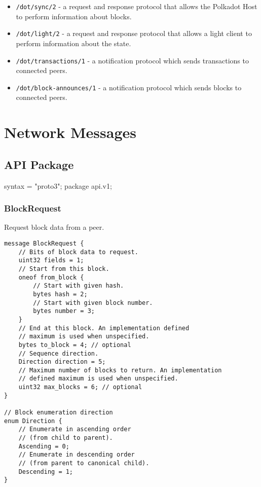 \documentclass{book}
\begin{document}
\begin{itemize}
    \item \verb|/dot/sync/2| - a request and response protocol that
    allows the Polkadot Host to perform information about blocks.
    \item \verb|/dot/light/2| - a request and response protocol that
    allows a light client to perform information about the state.
    \item \verb|/dot/transactions/1| - a notification protocol which
    sends transactions to connected peers.
    \item \verb|/dot/block-announces/1| - a notification protocol
    which sends blocks to connected peers.
\end{itemize}

\section{Network Messages}

\subsection{API Package}

syntax = "proto3";
package api.v1;

\subsubsection{BlockRequest}

Request block data from a peer.

\begin{lstlisting}[frame=single]
message BlockRequest {
    // Bits of block data to request.
    uint32 fields = 1;
    // Start from this block.
    oneof from_block {
        // Start with given hash.
        bytes hash = 2;
        // Start with given block number.
        bytes number = 3;
    }
    // End at this block. An implementation defined
    // maximum is used when unspecified.
    bytes to_block = 4; // optional
    // Sequence direction.
    Direction direction = 5;
    // Maximum number of blocks to return. An implementation 
    // defined maximum is used when unspecified.
    uint32 max_blocks = 6; // optional
}

// Block enumeration direction
enum Direction {
    // Enumerate in ascending order
    // (from child to parent).
    Ascending = 0;
    // Enumerate in descending order 
    // (from parent to canonical child).
    Descending = 1;
}
\end{lstlisting}
\end{document}
